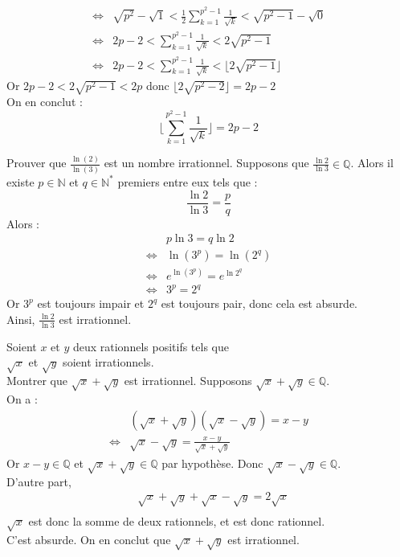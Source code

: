 \documentclass[11pt]{article}
\begin{document}
\begin{exercice}{}{}
\begin{align*}
        \iff&\sqrt{p^2}-\sqrt{1}<\frac{1}{2}\sum^{p^2-1}_{k=1}{\frac{1}{\sqrt{k}}}<\sqrt{p^2-1}-\sqrt{0}\\
        \iff&2p-2<\sum^{p^2-1}_{k=1}{\frac{1}{\sqrt{k}}}<2\sqrt{p^2-1}\\
        \iff&2p-2<\sum^{p^2-1}_{k=1}{\frac{1}{\sqrt{k}}}<\lfloor{2\sqrt{p^2-1}}\rfloor
    \end{align*}
    Or $2p-2<2\sqrt{p^2-1}<2p$ donc $\lfloor{2\sqrt{p^2-2}}\rfloor=2p-2$\\
    On en conclut : 
    \begin{equation*}
        \lfloor{\sum^{p^2-1}_{k=1}{\frac{1}{\sqrt{k}}}}\rfloor = 2p-2
    \end{equation*}
\end{exercice}

\begin{exercice}{}{}
    Prouver que $\frac{\ln(2)}{\ln(3)}$ est un nombre irrationnel.
    \tcblower
    Supposons que $\frac{\ln{2}}{\ln{3}}\in\mathbb{Q}$. Alors il existe $p\in\mathbb{N}$ et $q\in\mathbb{N}^*$ premiers entre eux tels que :
    \begin{equation*}
        \frac{\ln{2}}{\ln{3}}=\frac{p}{q}
    \end{equation*}
    Alors :
    \begin{align*}
        &p\ln{3}=q\ln{2}\\
        \iff&\ln(3^p)=\ln(2^q)\\
        \iff&e^{\ln(3^p)}=e^{\ln{2^q}}\\
        \iff&3^p=2^q
    \end{align*}
    Or $3^p$ est toujours impair et $2^q$ est toujours pair, donc cela est absurde.\\
    Ainsi, $\frac{\ln2}{\ln3}$ est irrationnel.
\end{exercice}

\begin{exercice}{}{}
    Soient $x$ et $y$ deux rationnels positifs tels que \\$\sqrt{x}$ et $\sqrt{y}$ soient irrationnels.\\
    Montrer que $\sqrt{x} + \sqrt{y}$ est irrationnel.
    \tcblower
    Supposons $\sqrt{x}+\sqrt{y}\in\mathbb{Q}$.\\
    On a :
    \begin{align*}
        &(\sqrt{x}+\sqrt{y})(\sqrt{x}-\sqrt{y})=x-y\\
        \iff&\sqrt{x}-\sqrt{y}=\frac{x-y}{\sqrt{x}+\sqrt{y}}
    \end{align*}
    Or $x-y\in\mathbb{Q}$ et $\sqrt{x}+\sqrt{y}\in\mathbb{Q}$ par hypothèse. Donc $\sqrt{x}-\sqrt{y}\in\mathbb{Q}$.\\
    D'autre part,
    \begin{align*}
        &\sqrt{x}+\sqrt{y}+\sqrt{x}-\sqrt{y}=2\sqrt{x}\\
    \end{align*}
    $\sqrt{x}$ est donc la somme de deux rationnels, et est donc rationnel.\\
    C'est absurde. On en conclut que $\sqrt{x}+\sqrt{y}$ est irrationnel.
\end{exercice}
\end{document}
